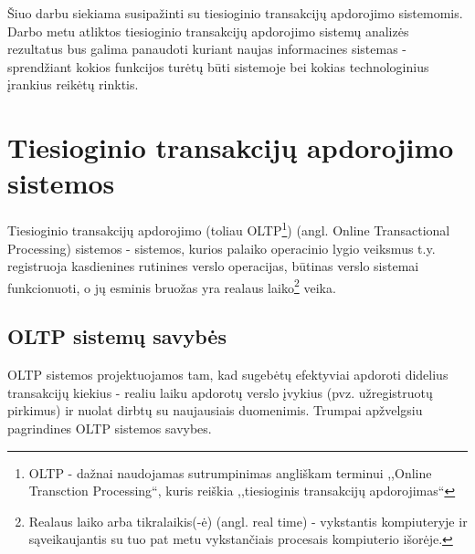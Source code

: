 \documentclass[12pt,a4paper,titlepage]{article}
\begin{document}
Šiuo darbu siekiama susipažinti su tiesioginio transakcijų apdorojimo sistemomis. Darbo metu atliktos tiesioginio transakcijų apdorojimo sistemų analizės rezultatus bus galima panaudoti kuriant naujas informacines sistemas - sprendžiant kokios funkcijos turėtų būti sistemoje bei kokias technologinius įrankius reikėtų rinktis.

\section{Tiesioginio transakcijų apdorojimo sistemos}

\begin{comment}
Online transactional processing (OLTP) is designed to efficiently process high volumes of transactions, instantly recording business events (such as a sales invoice payment) and reflecting changes as they occur.
\end{comment}

Tiesioginio transakcijų apdorojimo (toliau OLTP\footnote{OLTP - dažnai naudojamas sutrumpinimas angliškam terminui ,,Online Transction Processing``, kuris reiškia ,,tiesioginis transakcijų apdorojimas``}) (angl. Online Transactional Processing) sistemos - sistemos, kurios palaiko operacinio lygio veiksmus t.y. registruoja kasdienines rutinines verslo operacijas, būtinas verslo sistemai funkcionuoti, o jų esminis bruožas yra realaus laiko\footnote{Realaus laiko arba tikralaikis(-ė) (angl. real time) - vykstantis kompiuteryje ir sąveikaujantis su tuo pat metu vykstančiais procesais kompiuterio išorėje.\cite{DGJ08}} veika.

\subsection{OLTP sistemų savybės}

OLTP sistemos projektuojamos tam, kad sugebėtų efektyviai apdoroti didelius transakcijų kiekius - realiu laiku apdorotų verslo įvykius (pvz. užregistruotų pirkimus) ir nuolat dirbtų su naujausiais duomenimis. Trumpai apžvelgsiu pagrindines OLTP sistemos savybes.\\
\begin{comment}
The nature of OLTP environments is predominantly any kind of interactive ad hoc usage, such as telemarketeers entering telephone survey results. OLTP systems require short response times in order for users to remain productive.
\end{comment}
\end{document}
